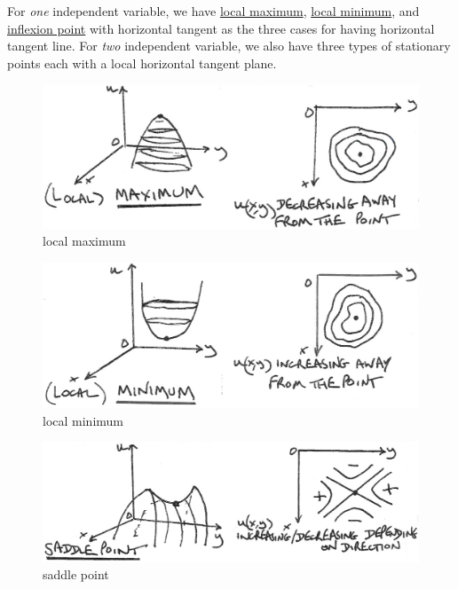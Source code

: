 \documentclass[12pt]{report}
\theoremstyle{definition}
\begin{document}
For \emph{one} independent variable, we have \underline{local maximum}, \underline{local minimum},
and \underline{inflexion point} with horizontal tangent as the three cases for having horizontal tangent line.
For \emph{two} independent variable, we also have three types of stationary points
each with a local horizontal tangent plane. 

\begin{figure}
  	\includegraphics[scale=0.15]{localMaximum.jpeg}
  	\centering
    \caption{local maximum}\label{fig:localMax}
\end{figure}

\begin{figure}
  	\includegraphics[scale=0.15]{localMinimum.jpeg}
  	\centering
    \caption{local minimum}\label{fig:localMin}
\end{figure}

\begin{figure}
  	\includegraphics[scale=0.15]{saddlePoint.jpeg}
  	\centering
    \caption{saddle point}\label{fig:saddlePoint}
\end{figure}
\end{document}
